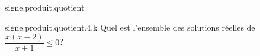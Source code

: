 \begin{qcm}{signe.produit.quotient}
    \begin{question}{signe.produit.quotient.4.k}
         Quel est l'ensemble des solutions réelles de \(\dfrac{x(x-2)}{x+1}\leqslant 0\)?
         \vspace{0.1cm}
         \begin{reponses}
	    \bonne{\(]-\infty,-1[\cup[0,2]\)}
            \mauvaise{\(]-\infty,-1[\cup]-1,0[\cup]0,2[\cup]2,+\infty[\)}
            \mauvaise{\(]-1,2]\)}
            \mauvaise{\(]-1,0[\cup]2,+\infty[\)}
            \mauvaise{\([0,2]\)}
         \end{reponses}
         \vspace{0.4cm}
    \end{question}
\end{qcm}